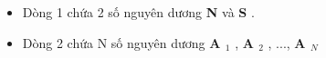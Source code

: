 \begin{itemize}
	\item Dòng 1 chứa 2 số nguyên dương \textbf{ N } và \textbf{ S } .
	\item Dòng 2 chứa N số nguyên dương \textbf{ A $_ 1 $} , \textbf{ A $_ 2 $} , ..., \textbf{ A $_ N $}
\end{itemize}